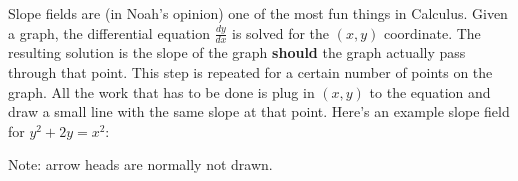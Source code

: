 \documentclass[../revisedmain.tex]{subfiles}
\begin{document}
	Slope fields are (in Noah's opinion) one of the most fun things in Calculus. Given a graph, the differential equation $\displaystyle\frac{dy}{dx}$ is solved for the $(x,y)$ coordinate. The resulting solution is the slope of the graph \textbf{should} the graph actually pass through that point. This step is repeated for a certain number of points on the graph. All the work that has to be done is plug in $(x,y)$ to the equation and draw a small line with the same slope at that point. Here's an example slope field for $y^2+2y=x^2$:
	\begin{center}
		\def\length{sqrt(1+(x-y)^2)}
		\newline Note: arrow heads are normally not drawn.
	\end{center}
\end{document}

